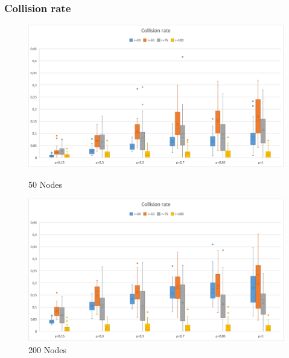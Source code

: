 \subsubsection{Collision rate}
\begin{figure}[H]
  \includegraphics[width=\linewidth]{./images/Collision50Boxplot.png}
  \caption{50 Nodes}\label{fig:awesome_image1}
\endminipage\hfill
{}
  \includegraphics[width=\linewidth]{./images/Collision200Boxplot.png}
  \caption{200 Nodes}\label{fig:awesome_image2}
\endminipage
\end{figure}

